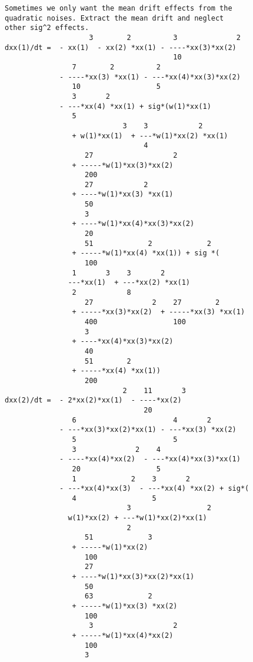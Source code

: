 \documentclass[11pt,a5paper]{article}
\begin{document}
\begin{verbatim}
Sometimes we only want the mean drift effects from the
quadratic noises. Extract the mean drift and neglect 
other sig^2 effects.
                    3        2          3              2
dxx(1)/dt =  - xx(1)  - xx(2) *xx(1) - ----*xx(3)*xx(2)
                                        10
                7        2          2
             - ----*xx(3) *xx(1) - ---*xx(4)*xx(3)*xx(2)
                10                  5
                3       2
             - ---*xx(4) *xx(1) + sig*(w(1)*xx(1)
                5
                            3    3            2
                + w(1)*xx(1)  + ---*w(1)*xx(2) *xx(1)
                                 4
                   27                   2
                + -----*w(1)*xx(3)*xx(2)
                   200
                   27            2
                + ----*w(1)*xx(3) *xx(1)
                   50
                   3
                + ----*w(1)*xx(4)*xx(3)*xx(2)
                   20
                   51             2             2
                + -----*w(1)*xx(4) *xx(1)) + sig *(
                   100
                1       3    3       2
               ---*xx(1)  + ---*xx(2) *xx(1)
                2            8
                   27              2    27        2
                + -----*xx(3)*xx(2)  + -----*xx(3) *xx(1)
                   400                  100
                   3
                + ----*xx(4)*xx(3)*xx(2)
                   40
                   51        2
                + -----*xx(4) *xx(1))
                   200
                            2    11       3
dxx(2)/dt =  - 2*xx(2)*xx(1)  - ----*xx(2)
                                 20
                6                       4       2
             - ---*xx(3)*xx(2)*xx(1) - ---*xx(3) *xx(2)
                5                       5
                3              2    4
             - ----*xx(4)*xx(2)  - ---*xx(4)*xx(3)*xx(1)
                20                  5
                1             2    3       2
             - ---*xx(4)*xx(3)  - ---*xx(4) *xx(2) + sig*(
                4                  5
                             3                  2
               w(1)*xx(2) + ---*w(1)*xx(2)*xx(1)
                             2
                   51             3
                + -----*w(1)*xx(2)
                   100
                   27
                + ----*w(1)*xx(3)*xx(2)*xx(1)
                   50
                   63             2
                + -----*w(1)*xx(3) *xx(2)
                   100
                    3                   2
                + -----*w(1)*xx(4)*xx(2)
                   100
                   3

\end{verbatim}
\end{document}
